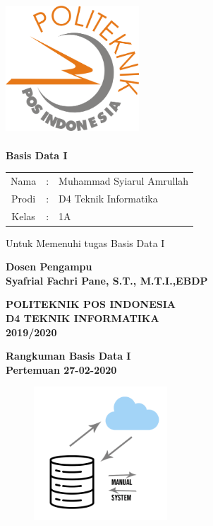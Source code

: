 \documentclass[a4paper,12pt]{article}
\begin{document}
        \begin{center}
            \includegraphics[width=5cm,height=5cm]{logo-poltekpos.png}
        \end{center}
        \begin{center}
            \textbf{Basis  Data I} \\
        \end{center}
        \vspace{-0.6cm}
        \begin{center}
            \begin{tabular}{ c c l}
                Nama & : & Muhammad Syiarul Amrullah\\
                Prodi & : & D4 Teknik Informatika\\
                Kelas & : & 1A
            \end{tabular}
        \end{center}
        \vspace{0.6cm}
        \begin{center}
            Untuk Memenuhi tugas Basis Data I\\
        \end{center}
        \begin{center}
          \textbf{Dosen Pengampu}\\
          \textbf{Syafrial Fachri Pane, S.T., M.T.I.,EBDP}
        \end{center}
        \vspace{0.5cm}
        \begin{center}
            \textbf{POLITEKNIK POS INDONESIA}\\
            \textbf{D4 TEKNIK INFORMATIKA}\\
            \textbf{2019/2020}
        \end{center}
        \newpage
        \begin{center}
          \huge{\textbf{Rangkuman Basis Data I\\Pertemuan 27-02-2020}} %
        \end{center}
         \begin{figure}
            \centering
            \includegraphics[width=5cm]{database&cloud.png}
          \end{figure}
\end{document}
